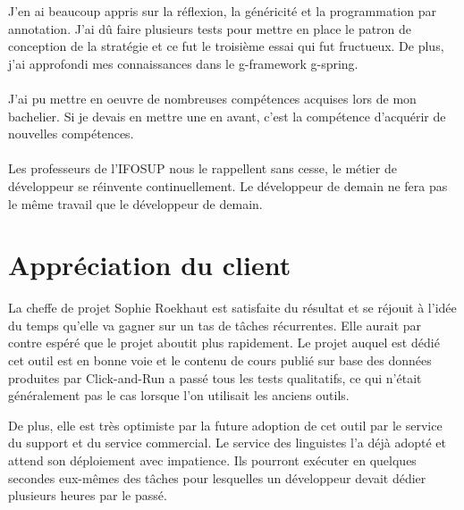 J'en ai beaucoup appris sur la réflexion, la généricité et la programmation par annotation.
J'ai dû faire plusieurs tests pour mettre en place le patron de conception de la stratégie et ce fut le troisième essai qui fut fructueux.
De plus, j'ai approfondi mes connaissances dans le \gls{g-framework} \Gls{g-spring}.

\paragraph{}
J'ai pu mettre en oeuvre de nombreuses compétences acquises lors de mon bachelier.
Si je devais en mettre une en avant, c'est la compétence d'acquérir de nouvelles compétences.

\paragraph{}
Les professeurs de l'IFOSUP nous le rappellent sans cesse, le métier de développeur se réinvente continuellement.
Le développeur de demain ne fera pas le même travail que le développeur de demain.

\section{Appréciation du client}
\label{sec:client-loves-me}

La cheffe de projet Sophie Roekhaut est satisfaite du résultat et se réjouit à l'idée du temps qu'elle va gagner sur un tas de tâches récurrentes.
Elle aurait par contre espéré que le projet aboutit plus rapidement.
Le projet auquel est dédié cet outil est en bonne voie et le contenu de cours publié sur base des données produites par Click-and-Run a passé tous les tests qualitatifs, ce qui n'était généralement pas le cas lorsque l'on utilisait les anciens outils.

De plus, elle est très optimiste par la future adoption de cet outil par le service du support et du service commercial.
Le service des linguistes l'a déjà adopté et attend son déploiement avec impatience.
Ils pourront exécuter en quelques secondes eux-mêmes des tâches pour lesquelles un développeur devait dédier plusieurs heures par le passé.

